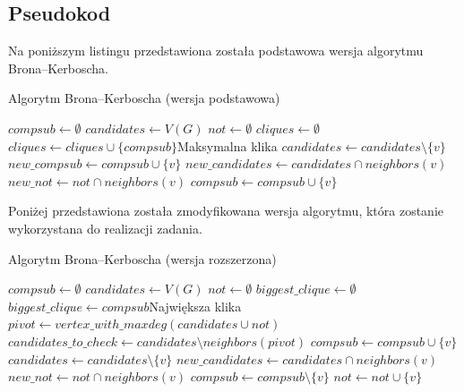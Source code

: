 \documentclass[12pt, a4paper]{article}
\begin{document}
\subsection{Pseudokod}
Na poniższym listingu przedstawiona została podstawowa wersja algorytmu Brona--Kerboscha. 
\begin{algorithm}[!htb]
\caption{Algorytm Brona--Kerboscha (wersja podstawowa)}\label{bron1}
\begin{algorithmic}[1]
\State $compsub \gets \emptyset$
\State $candidates \gets V(G)$
\State $not \gets \emptyset$
\State $cliques \gets \emptyset$
		 \State $cliques \gets cliques \cup \{compsub\}$\Comment Maksymalna klika
	\Else
		\State $candidates \gets candidates \setminus \{v\}$
		\State $new\_compsub \gets compsub \cup \{v\}$
		\State $new\_candidates \gets candidates \cap neighbors(v)$
		\State $new\_not \gets not \cap neighbors(v)$
		\State{}
		\State $compsub \gets compsub \cup \{v\}$
	\EndFor
	\EndIf
\EndFunction
\end{algorithmic}
\end{algorithm}

Poniżej przedstawiona została zmodyfikowana wersja algorytmu, która zostanie wykorzystana do realizacji zadania.
\begin{algorithm}[!htb]
\caption{Algorytm Brona--Kerboscha (wersja rozszerzona)}\label{bron2}
\begin{algorithmic}[1]
\State $compsub \gets \emptyset$
\State $candidates \gets V(G)$
\State $not \gets \emptyset$
\State $biggest\_clique \gets \emptyset$
		 	\State $biggest\_clique \gets compsub$\Comment Największa klika
		 \EndIf
	\Else
	\State $pivot \gets vertex\_with\_maxdeg(candidates \cup not)$
	\State $candidates\_to\_check \gets candidates \setminus neighbors(pivot)$
		\State $compsub \gets compsub \cup \{v\}$
		\State $candidates \gets candidates \setminus \{v\}$
		\State $new\_candidates \gets candidates \cap neighbors(v)$
		\State $new\_not \gets not \cap neighbors(v)$
		\State{}
		\State $compsub \gets compsub \setminus \{v\}$
		\State $not \gets not \cup \{v\}$
	\EndFor
	\EndIf
\EndFunction
\end{algorithmic}
\end{algorithm}
\end{document}
